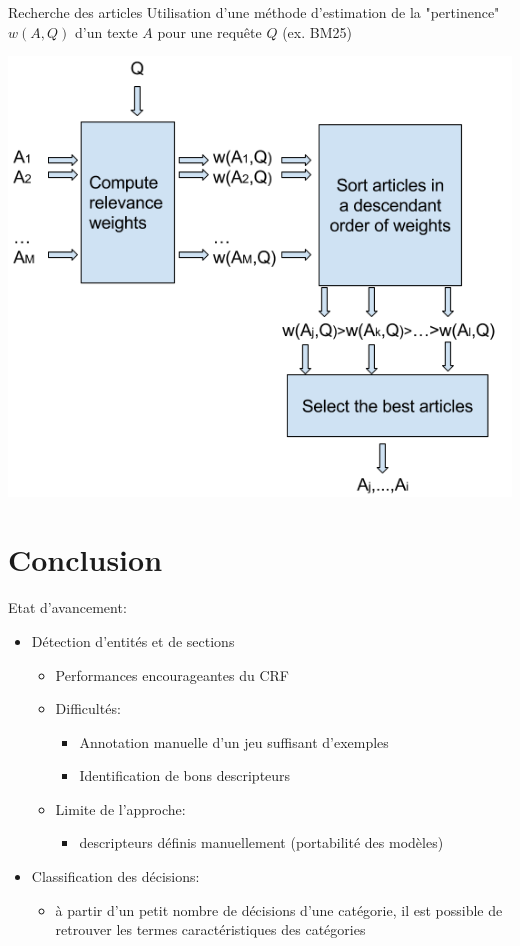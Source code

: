 \documentclass[newPxFont,pagenumber]{beamer}
\begin{document}
\begin{frame}{Recherche des articles}
Utilisation d'une méthode d'estimation de la "pertinence" $w(A,Q)$ d'un texte $A$ pour une requête $Q$ (ex. BM25)

\centering \includegraphics[scale=0.5]{coliee-bm25.png}
\end{frame}

%
%
\section{Conclusion}

\begin{frame}{Etat d'avancement:}
\begin{itemize}
\item Détection d'entités et de sections
\begin{itemize}
\item Performances encourageantes du CRF
\item Difficultés:
\begin{itemize}
\item Annotation manuelle d'un jeu suffisant d'exemples
\item Identification de bons descripteurs 
\end{itemize}
\item Limite de l'approche:
\begin{itemize}
\item descripteurs définis manuellement (portabilité des modèles)
\end{itemize}
\end{itemize}
\item Classification des décisions:
\begin{itemize}
\item à partir d'un petit nombre de décisions d'une catégorie, il est possible de retrouver les termes caractéristiques des catégories
\end{itemize}
\end{itemize}

\end{frame}
\end{document}
